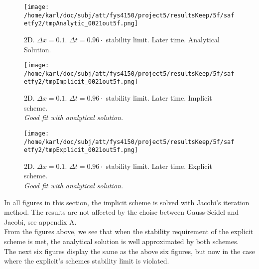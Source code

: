 \documentclass{article}
\begin{document}
\begin{minipage}{.30\textwidth} 
	\begin{figure}[H]
		\centering
		\texttt{[image: /home/karl/doc/subj/att/fys4150/project5/resultsKeep/5f/safetfy2/tmpAnalytic\_0021out5f.png]}
		\caption{2D. $\Delta x = 0.1$. $\Delta t = 0.96 \cdot$ stability limit. Later time. Analytical Solution.\\ \textit{}}
		\label{fig:fig2d4}
	\end{figure}
\end{minipage}\hfill
\begin{minipage}{.30\textwidth} 
	\begin{figure}[H]
		\centering
		\texttt{[image: /home/karl/doc/subj/att/fys4150/project5/resultsKeep/5f/safetfy2/tmpImplicit\_0021out5f.png]}
		\caption{2D. $\Delta x = 0.1$. $\Delta t = 0.96 \cdot$ stability limit. Later time. Implicit scheme.\\ \textit{Good fit with analytical solution.}}
		\label{fig:fig2d5}
	\end{figure}
\end{minipage}\hfill
\begin{minipage}{.30\textwidth} 
	\begin{figure}[H]
		\centering
		\texttt{[image: /home/karl/doc/subj/att/fys4150/project5/resultsKeep/5f/safetfy2/tmpExplicit\_0021out5f.png]}
		\caption{2D. $\Delta x = 0.1$. $\Delta t = 0.96 \cdot$ stability limit. Later time. Explicit scheme.\\ \textit{Good fit with analytical solution.}}
		\label{fig:fig2d6}
	\end{figure}
\end{minipage}\hfill
\vspace{2ex}

In all figures in this section, the implicit scheme is solved with Jacobi's iteration method. The results are not affected by the choise between Gauss-Seidel and Jacobi, see appendix A.\\

From the figures above, we see that when the stability requirement of the explicit scheme is met, the analytical solution is well approximated by both schemes.\\

The next six figures display the same as the above six figures, but now in the case where the explicit's schemes stability limit is violated. 
\end{document}
